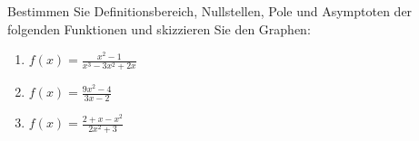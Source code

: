 \begin{ExerciseBlock}
Bestimmen Sie Definitionsbereich, Nullstellen, Pole und Asymptoten der folgenden Funktionen und skizzieren Sie den Graphen: 
\begin{enumerate}[label=\alph*)]
\item $\displaystyle f(x)=\frac{x^2-1}{x^3-3x^2+2x}$
\item $\displaystyle f(x)=\frac{9x^2-4}{3x-2}$
\item $\displaystyle f(x)=\frac{2+x-x^2}{2x^2+3}$
\end{enumerate}

\end{ExerciseBlock}
